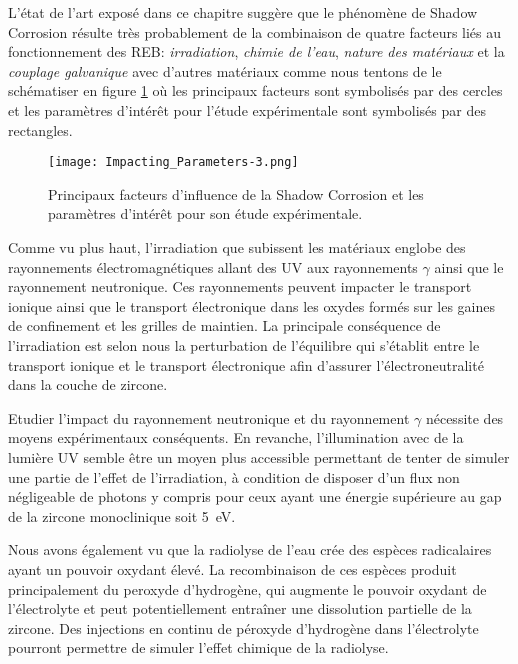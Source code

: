 \begin{refsection}
    L'état de l'art exposé dans ce chapitre suggère que le phénomène de Shadow Corrosion résulte très
    probablement de la combinaison de quatre facteurs 
    liés au fonctionnement des REB: \emph{irradiation}, \emph{chimie de l’eau}, \emph{nature des matériaux} et la
    \emph{couplage galvanique} avec d’autres matériaux comme nous tentons de le schématiser en
    figure \ref{fig:impacting_parameters} où les principaux facteurs sont symbolisés par des cercles et les paramètres
    d'intérêt pour l'étude expérimentale sont symbolisés par des rectangles. 

    \begin{figure}[H] 
 		\centering 
 		\texttt{[image: Impacting\_Parameters-3.png]} 
 		\caption{Principaux facteurs d'influence de la Shadow Corrosion et les paramètres d'intérêt pour son étude
        expérimentale.} 
 		\label{fig:impacting_parameters} 
 	\end{figure}

    Comme vu plus haut, l’irradiation que subissent les matériaux englobe des rayonnements électromagnétiques allant 
    des UV aux
    rayonnements $\gamma$ ainsi que le rayonnement neutronique. Ces rayonnements peuvent impacter le transport ionique
    ainsi que le transport électronique dans les oxydes formés sur les gaines de confinement et les grilles de maintien. 
    La principale conséquence de l'irradiation est selon nous la perturbation de l'équilibre qui s'établit entre le transport
    ionique et le transport électronique afin d'assurer l'électroneutralité dans la couche de zircone.

    Etudier l'impact du rayonnement neutronique et du rayonnement $\gamma$ nécessite des moyens expérimentaux
    conséquents. En revanche, l'illumination avec de la lumière UV semble être un moyen plus accessible 
    permettant de tenter de simuler
    une partie de l'effet de l'irradiation, à condition de disposer d'un flux non négligeable de photons y compris
    pour ceux ayant une énergie
    supérieure au gap de la zircone monoclinique soit \SI{5}{\electronvolt}.

    Nous avons également vu que la radiolyse de l’eau crée des espèces radicalaires ayant un pouvoir oxydant élevé. La
    recombinaison de ces espèces produit principalement du peroxyde d’hydrogène, qui augmente le
    pouvoir oxydant de l'électrolyte et peut potentiellement entraîner une dissolution partielle de la zircone. 
    Des injections en continu de péroxyde d'hydrogène dans l'électrolyte pourront permettre de simuler l'effet chimique
    de la radiolyse. 
    

\end{refsection}

